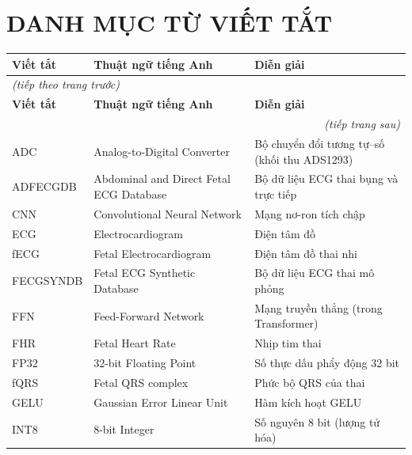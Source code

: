 \chapter*{DANH MỤC TỪ VIẾT TẮT}

\renewcommand{\arraystretch}{1.3}
\begin{center}
\begin{longtable}{p{2.3cm} p{5.5cm} p{6.2cm}}
\hline
\textbf{Viết tắt} & \textbf{Thuật ngữ tiếng Anh} & \textbf{Diễn giải} \\
\hline
\endfirsthead
\multicolumn{3}{l}{\textit{(tiếp theo trang trước)}} \\
\hline
\textbf{Viết tắt} & \textbf{Thuật ngữ tiếng Anh} & \textbf{Diễn giải} \\
\hline
\endhead
\hline
\multicolumn{3}{r}{\textit{(tiếp trang sau)}} \\
\endfoot
\hline
\endlastfoot
ADC        & Analog-to-Digital Converter            & Bộ chuyển đổi tương tự--số (khối thu ADS1293) \\
ADFECGDB   & Abdominal and Direct Fetal ECG Database & Bộ dữ liệu ECG thai bụng và trực tiếp \\
CNN        & Convolutional Neural Network            & Mạng nơ-ron tích chập \\
ECG        & Electrocardiogram                       & Điện tâm đồ \\
fECG       & Fetal Electrocardiogram                 & Điện tâm đồ thai nhi \\
FECGSYNDB  & Fetal ECG Synthetic Database            & Bộ dữ liệu ECG thai mô phỏng \\
FFN        & Feed-Forward Network                    & Mạng truyền thẳng (trong Transformer) \\
FHR        & Fetal Heart Rate                        & Nhịp tim thai \\
FP32       & 32-bit Floating Point                   & Số thực dấu phẩy động 32 bit \\
fQRS       & Fetal QRS complex                       & Phức bộ QRS của thai \\
GELU       & Gaussian Error Linear Unit              & Hàm kích hoạt GELU \\
INT8       & 8-bit Integer                           & Số nguyên 8 bit (lượng tử hóa) \\

\end{longtable}
\end{center}
